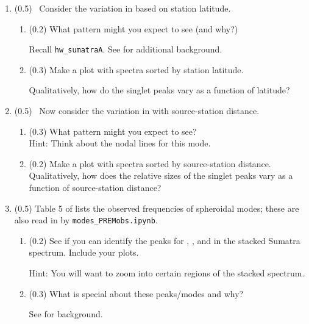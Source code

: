 \documentclass[11pt,titlepage,fleqn]{article}
\begin{document}
\begin{enumerate}

\item (0.5) \ptag\ Consider the variation in  based on station latitude.
%
\begin{enumerate}
\item (0.2) What pattern might you expect to see (and why?)

Recall \verb+hw_sumatraA+.
See \citet[][Figure 3]{SSteinOkal2007} for additional background.

\item (0.3) Make a plot with   spectra sorted by station latitude.

Qualitatively, how do the singlet peaks vary as a function of latitude?

\end{enumerate}


\item (0.5) \ptag\ Now consider the variation in  with source-station distance.
%
\begin{enumerate}
\item (0.3) What pattern might you expect to see? \\
Hint: Think about the nodal lines for this mode.

\item (0.2) Make a plot with   spectra sorted by source-station distance. Qualitatively, how does the relative sizes of the singlet peaks vary as a function of source-station distance?
\end{enumerate}


\item (0.5) Table 5 of \citet{PREM} lists the observed frequencies of spheroidal modes; these are also read in by \verb+modes_PREMobs.ipynb+.
%
\begin{enumerate}
\item (0.2) See if you can identify the peaks for , , and  in the stacked Sumatra spectrum. Include your plots.

Hint: You will want to zoom into certain regions of the stacked spectrum.

\item (0.3) What is special about these peaks/modes and why?

See \citet[][p. 106]{SteinWysession} for background.
\end{enumerate}

\end{enumerate}
\end{document}
